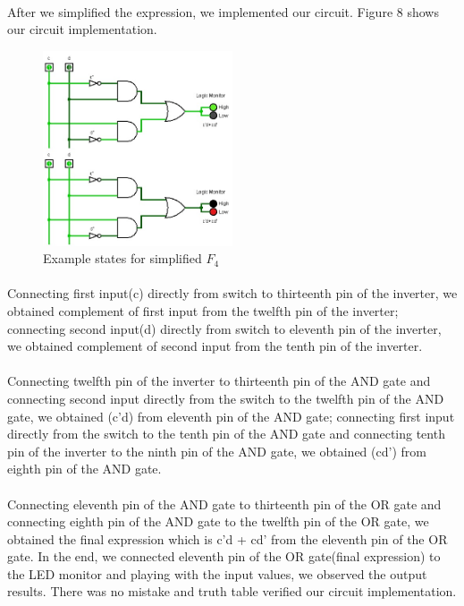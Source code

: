 \documentclass[pdftex,12pt,a4paper]{article}
\begin{document}
\paragraph{}
After we simplified the expression, we implemented our circuit. Figure 8 shows our circuit implementation.

\begin{figure}[!h]
	\centering
	\includegraphics[width=0.5\textwidth]{E2P4.1.1.jpg}	
	\caption{Example states for simplified $F_{4}$}
	\label{Figure 8}
\end{figure}

\paragraph{}
Connecting first input(c) directly from switch to thirteenth pin of the inverter, we obtained complement of first input from the twelfth pin of the inverter; connecting second input(d) directly from switch to eleventh pin of the inverter, we obtained complement of second input from the tenth pin of the inverter.
\paragraph{}
Connecting twelfth pin of the inverter to thirteenth pin of the AND gate and connecting second input directly from the switch to the twelfth pin of the AND gate, we obtained (c'd) from eleventh pin of the AND gate; connecting first input directly from the switch to the tenth pin of the AND gate and connecting tenth pin of the inverter to the ninth pin of the AND gate, we obtained (cd') from eighth pin of the AND gate. 
\paragraph{}
Connecting eleventh pin of the AND gate to thirteenth pin of the OR gate and connecting eighth pin of the AND gate to the twelfth pin of the OR gate, we obtained the final expression which is c'd + cd' from the eleventh pin of the OR gate. In the end, we connected eleventh pin of the OR gate(final expression) to the LED monitor and playing with the input values, we observed the output results. There was no mistake and truth table verified our circuit implementation.
\end{document}
